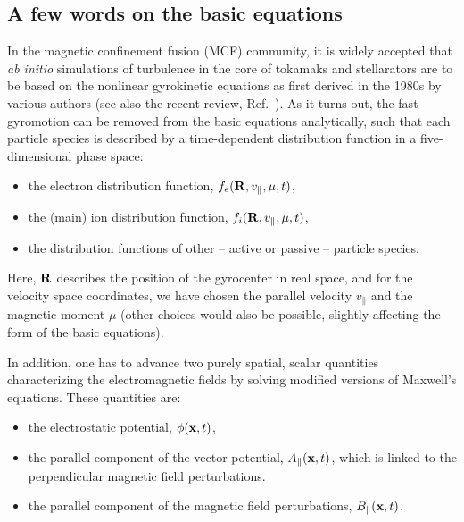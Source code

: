 \documentclass[12pt]{article}
\begin{document}
\subsection{A few words on the basic equations}

In the magnetic confinement fusion (MCF) community, it is widely accepted that {\em ab initio}
simulations of turbulence in the core of tokamaks and stellarators are to be based on the
nonlinear gyrokinetic equations as first derived in the 1980s by various authors \cite{frieman82,
hahm88,hahmbriz88,brizard89} (see also the recent review, Ref.~\cite{GK07}). As it turns out, the fast
gyromotion can be removed from the basic equations analytically, such that each particle species
is described by a time-dependent distribution function in a five-dimensional phase space:
\begin{itemize}
\item the electron distribution function, $f_e({\bf R},v_\|,\mu,t)$,
\item the (main) ion distribution function, $f_i({\bf R},v_\|,\mu,t)$,
\item the distribution functions of other -- active or passive -- particle species.
\end{itemize}
Here, ${\bf R}$ describes the position of the gyrocenter in real space, and for the velocity
space coordinates, we have chosen the parallel velocity $v_\|$ and the magnetic moment $\mu$
(other choices would also be possible, slightly affecting the form of the basic equations).

In addition, one has to advance two purely spatial, scalar quantities characterizing the
electromagnetic fields by solving modified versions of Maxwell's equations. These quantities are:

\begin{itemize}
\item the electrostatic potential, $\phi({\bf x},t)$,
\item the parallel component of the vector potential, $A_\|({\bf x},t)$, which is linked to the
  perpendicular magnetic field perturbations.
\item the parallel component of the magnetic field perturbations, $B_\|({\bf x},t)$.
\end{itemize}
\end{document}
